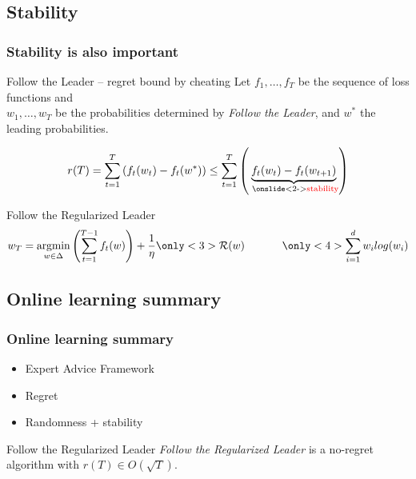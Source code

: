 \documentclass{beamer}
\newcommand{\mR}{\ensuremath{\mathcal{R}}}
\DeclareMathOperator*{\argmin}{argmin}
\newcommand{\inserteqstrut}[1]{%
	\rlap{$\displaystyle#1$}%
	\phantom{\biggesteq}}
\newcommand{\biggesteq}{%
	\vphantom{\sum_{i=1}^{d} w_i log(w_i)}%
	\hphantom{\sum_{i=1}^{d} w_i log(w_i)}%
}
\begin{document}
\subsection{Stability}
\begin{frame}
	\frametitle{Stability is also important}
		\begin{block}{Follow the Leader -- regret bound by cheating}
			Let $f_1 ,\ldots, f_T$ be the sequence of loss functions and \\
			$w_1 ,\ldots, w_T$ be the probabilities determined by \textit{Follow the Leader},
			and $w^*$ the leading probabilities.
			
			\begin{equation*}
				r(T) =  \sum_{t=1}^{T}  \left( f_t(w_t) - f_t(w^*) \right)
				\leq
				\sum_{t=1}^{T} \left( \underbrace{f_t(w_t) - f_t(w_{t+1})}_\text{ \onslide<2->{\textcolor{red}{stability}}} \right)
			\end{equation*}
		\end{block}

\pause[3]
	\begin{block}{Follow the Regularized Leader \only<4>{\textcolor{lightgray}{with entropic regularizer}}}
	\begin{equation*}
	w_T
	= \argmin_{w \in \Delta}  \left(\sum_{t=1}^{T-1} f_t(w) \right) + \frac{1}{\eta}  \only<3>{\inserteqstrut{\mR(w)}} \only<4>{\inserteqstrut{\sum_{i=1}^{d} w_i log(w_i)}}
	\end{equation*}
	\end{block}

\end{frame}


\subsection{Online learning summary}
\begin{frame}
	\frametitle{Online learning summary}
	\begin{itemize}
		\item Expert Advice Framework \pause
		\item Regret \pause
		\item Randomness + stability \pause
	\end{itemize}
	
	\begin{block}{Follow the Regularized Leader}
		\textit{Follow the Regularized Leader} is a no-regret algorithm with $r(T)\in O(\sqrt{T})$.
	\end{block}
\end{frame}
\end{document}
